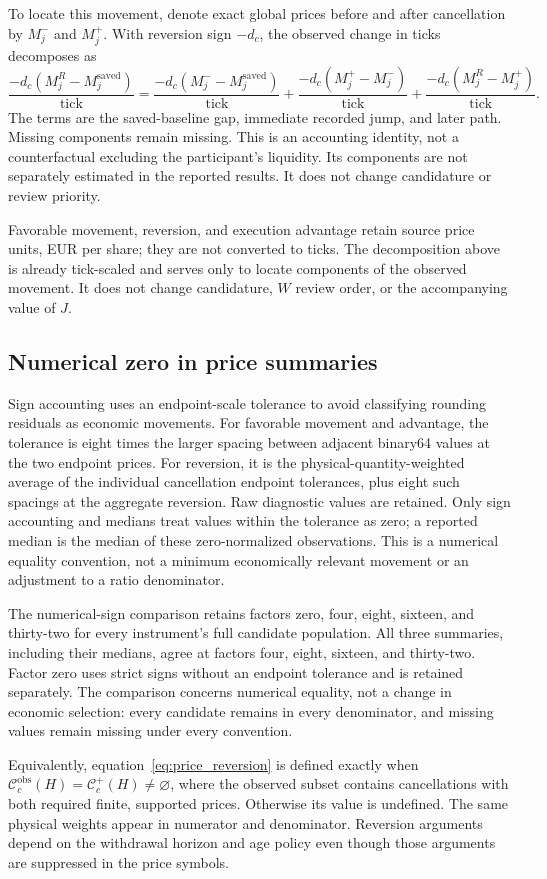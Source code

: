 To locate this movement, denote exact global prices before and after cancellation by $M_j^-$ and $M_j^+$. With reversion sign $-d_c$, the observed change in ticks decomposes as
\begin{equation}
\frac{-d_c(M_j^{R}-M_j^{\mathrm{saved}})}{\mathrm{tick}}
=\frac{-d_c(M_j^{-}-M_j^{\mathrm{saved}})}{\mathrm{tick}}
+\frac{-d_c(M_j^{+}-M_j^{-})}{\mathrm{tick}}
+\frac{-d_c(M_j^{R}-M_j^{+})}{\mathrm{tick}}.
\label{eq:observed_rev_decomposition}
\end{equation}
The terms are the saved-baseline gap, immediate recorded jump, and later path. Missing components remain missing. This is an accounting identity, not a counterfactual excluding the participant's liquidity. Its components are not separately estimated in the reported results. It does not change candidature or review priority.

Favorable movement, reversion, and execution advantage retain source price units, EUR per share; they are not converted to ticks. The decomposition above is already tick-scaled and serves only to locate components of the observed movement. It does not change candidature, $W$ review order, or the accompanying value of $J$.

\subsection{Numerical zero in price summaries}
\label{subsec:price_numerical_signs}
Sign accounting uses an endpoint-scale tolerance to avoid classifying rounding residuals as economic movements. For favorable movement and advantage, the tolerance is eight times the larger spacing between adjacent binary64 values at the two endpoint prices. For reversion, it is the physical-quantity-weighted average of the individual cancellation endpoint tolerances, plus eight such spacings at the aggregate reversion. Raw diagnostic values are retained. Only sign accounting and medians treat values within the tolerance as zero; a reported median is the median of these zero-normalized observations. This is a numerical equality convention, not a minimum economically relevant movement or an adjustment to a ratio denominator.

The numerical-sign comparison retains factors zero, four, eight, sixteen, and thirty-two for every instrument's full candidate population. All three summaries, including their medians, agree at factors four, eight, sixteen, and thirty-two. Factor zero uses strict signs without an endpoint tolerance and is retained separately. The comparison concerns numerical equality, not a change in economic selection: every candidate remains in every denominator, and missing values remain missing under every convention.


Equivalently, equation~\eqref{eq:price_reversion} is defined exactly when $\mathcal C_c^{\mathrm{obs}}(H)=\mathcal C_c^+(H)\ne\varnothing$, where the observed subset contains cancellations with both required finite, supported prices. Otherwise its value is undefined. The same physical weights appear in numerator and denominator. Reversion arguments depend on the withdrawal horizon and age policy even though those arguments are suppressed in the price symbols.
